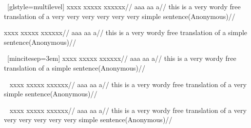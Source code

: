 \documentclass{article}
\begin{document}
\ex~[glstyle=multilevel]
\begingl
\gla xxxx xxxxx xxxxxx//
\glb aaa aa a//
\glft this is a very wordy free translation
of a very very very
very very very
simple sentence\hfill (Anonymous)//
\endgl
\xe


\ex
\begingl
\gla xxxx xxxxx xxxxxx//
\glb aaa aa a//
\glft this is a very wordy free translation
of a simple sentence\givecite (Anonymous)//
\endgl
\xe

\ex~[mincitesep=3em]
\begingl
\gla xxxx xxxxx xxxxxx//
\glb aaa aa a//
\glft this is a very wordy free translation
of a simple sentence\givecite (Anonymous)//
\endgl
\xe

\ex~
\begingl
\gla xxxx xxxxx xxxxxx//
\glb aaa aa a//
\glft this is a very wordy free translation
of a very simple sentence\givecite (Anonymous)//
\endgl
\xe

\ex~
\begingl
\gla xxxx xxxxx xxxxxx//
\glb aaa aa a//
\glft this is a very wordy free translation
of a very very very
very very very
simple sentence\givecite (Anonymous)//
\endgl
\xe
\end{document}
